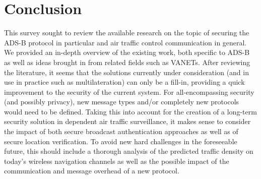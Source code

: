 \documentclass[english]{IEEEtran}
\begin{document}
\section{Conclusion \label{sec:Conclusion}}

This survey sought to review the available research on the topic of
securing the ADS-B protocol in particular and air traffic control
communication in general. We provided an in-depth overview of the
existing work, both specific to ADS-B as well as ideas brought in
from related fields such as VANETs. After reviewing the literature,
it seems that the solutions currently under consideration (and in
use in practice such as multilateration) can only be a fill-in, providing
a quick improvement to the security of the current system. For all-encompassing
security (and possibly privacy), new message types and/or completely
new protocols would need to be defined. Taking this into account for
the creation of a long-term security solution in dependent air traffic
surveillance, it makes sense to consider the impact of both secure
broadcast authentication approaches as well as of secure location
verification. To avoid new hard challenges in the foreseeable future,
this should include a thorough analysis of the predicted traffic density
on today's wireless navigation channels as well as the possible impact
of the communication and message overhead of a new protocol.\\




\end{document}
